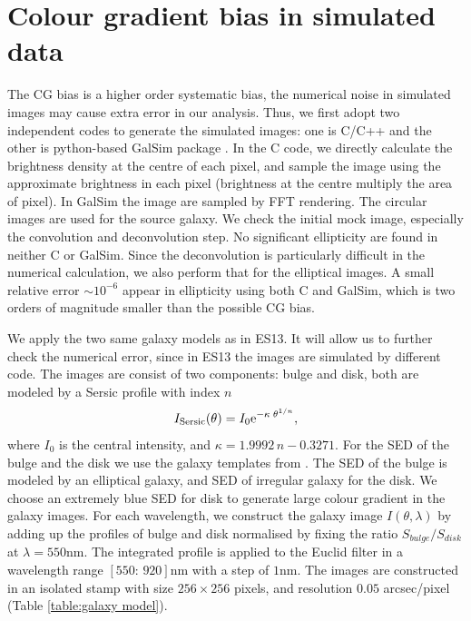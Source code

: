 \documentclass[useAMS,usenatbib]{mn2e}
\newcommand{\be}{\begin{equation}}
\newcommand{\ee}{\end{equation}}
\begin{document}
\section{Colour gradient bias in simulated data}

The CG bias is a higher order systematic bias, the numerical noise in
simulated images may cause extra error in our analysis. Thus, we first
adopt two independent codes to generate the simulated images: one is C/C++
and the other is python-based GalSim package
\citep{2015A&amp;C....10..121R}. In the C code, we directly calculate
the brightness density at the centre of each pixel, and sample the
image using the approximate brightness in each pixel (brightness at
the centre multiply the area of pixel). In GalSim the image are sampled
by FFT rendering.
%
The circular images are used for the source galaxy. We check the
initial mock image, especially the convolution and deconvolution 
step. No significant ellipticity are found in neither C or
GalSim.  Since the deconvolution is particularly difficult in the
numerical calculation, we also perform that for the elliptical
images. A small relative error $\sim10^{-6}$ appear in ellipticity
using both C and GalSim, which is two orders of magnitude smaller than
the possible CG bias.

We apply the two same galaxy models as in ES13. It will allow us to further
check the numerical error, since in ES13 the images are simulated by
different code. The images are consist of two
components: bulge and disk, both are modeled by a Sersic profile with index $n$
%
\be
I_{\rm Sersic}(\theta) = I_0 {\rm e}^{-\kappa\; \theta^{1/n}},
\ee
%
where $I_0$ is the central intensity, and $\kappa=1.9992\,n -
0.3271$.  For the SED of the bulge and the disk we use the galaxy
templates from \citet{1980ApJS...43..393C}. The SED of the bulge is
modeled by an elliptical galaxy, and SED of irregular galaxy for the
disk. We choose an extremely blue SED for disk to generate large
colour gradient in the galaxy images. For each wavelength, we
construct the galaxy image $I(\theta,\lambda)$ by adding up the
profiles of bulge and disk normalised by fixing the ratio
$S_{bulge}/S_{disk}$ at $\lambda=550$nm. The integrated profile is
applied to the Euclid filter in a wavelength range $[550:\,920]$nm
with a step of $1$nm. The images are constructed in an isolated stamp
with size $256\times256$ pixels, and resolution $0.05$ arcsec/pixel
(Table \ref{table:galaxy model}).
\end{document}
